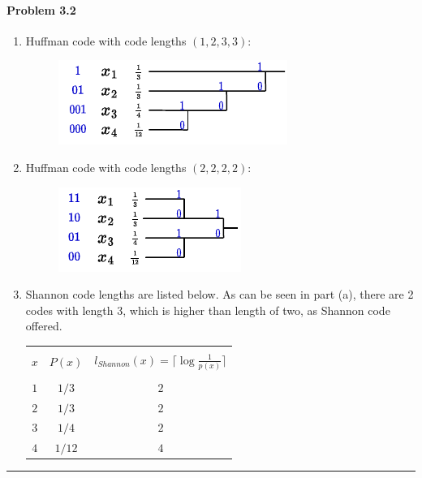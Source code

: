 \documentclass[12pt, letterpaper]{scrartcl}
\begin{document}
\paragraph*{Problem 3.2} \hfill\newline
\begin{enumerate}[((a))]
    \item
    Huffman code with code lengths $(1,2,3,3)$:
    \begin{figure}[H]
        \includegraphics[width=0.5\linewidth]{hw3_figures/3.2a.pdf}
        \centering
    \end{figure}
    
    \item
    Huffman code with code lengths $(2,2,2,2)$:
    \begin{figure}[H]
        \includegraphics[width=0.5\linewidth]{hw3_figures/3.2b.pdf}
        \centering
    \end{figure}
    
    \item
    Shannon code lengths are listed below. As can be seen in part (a), there are 2 codes with length 3, which is higher than length of two, as Shannon code offered.
    \begin{center}
        \begin{tabular}{ c c c} 
         \hline
         \\$x$ & $P(x)$ & $l_{Shannon}(x)=\lceil\log{\frac{1}{p(x)}}\rceil$\\\\
         \hline
         $1$ & $1/3$ & $2$\\
         $2$ & $1/3$ & $2$  \\
         $3$ & $1/4$ & $2$ \\
         $4$ & $1/12$ & $4$  \\
         \hline
        \end{tabular}
    \end{center}
\end{enumerate}
\hrule
\end{document}
